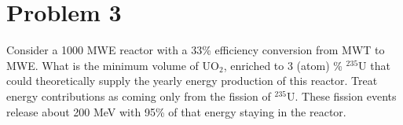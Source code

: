 \section*{Problem 3}

Consider a 1000 MWE reactor with a 33\% efficiency conversion from MWT to MWE. 
What is the minimum volume of UO$_2$, enriched to 3 (atom) \% $^{235}$U that could theoretically supply the yearly energy production of this reactor. 
Treat energy contributions as coming only from the fission of $^{235}$U. 
These fission events release about 200 MeV with 95\% of that energy staying in the reactor.

